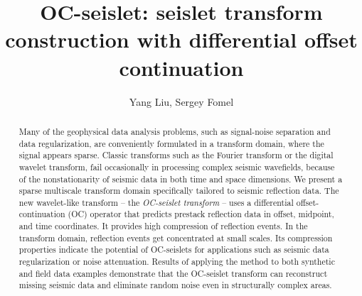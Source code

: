 \title{OC-seislet: seislet transform construction with differential offset continuation}

\renewcommand{\thefootnote}{\fnsymbol{footnote}}


\address{
\footnotemark[1] College of Geo-exploration Science and Technology,\\
Jilin University \\
No.6 Xi minzhu street, \\
Changchun, China, 130026 \\
\footnotemark[2] Bureau of Economic Geology,\\
John A. and Katherine G. Jackson School of Geosciences \\
The University of Texas at Austin \\
University Station, Box X \\
Austin, TX, USA, 78713-8924}

\author{Yang Liu\footnotemark[1]\footnotemark[2], Sergey Fomel\footnotemark[2]}

\maketitle

\begin{abstract}

 Many of the geophysical data analysis problems, such as signal-noise
 separation and data regularization, are conveniently formulated in a
 transform domain, where the signal appears sparse. Classic transforms
 such as the Fourier transform or the digital wavelet transform, fail
 occasionally in processing complex seismic wavefields, because of the
 nonstationarity of seismic data in both time and space dimensions. We
 present a sparse multiscale transform domain specifically tailored to
 seismic reflection data. The new wavelet-like transform -- the
 \emph{OC-seislet transform} -- uses a differential
 offset-continuation (OC) operator that predicts prestack reflection
 data in offset, midpoint, and time coordinates. It provides high
 compression of reflection events. In the transform domain, reflection
 events get concentrated at small scales. Its compression properties
 indicate the potential of OC-seislets for applications such as
 seismic data regularization or noise attenuation. Results of applying
 the method to both synthetic and field data examples demonstrate that
 the OC-seislet transform can reconstruct missing seismic data and
 eliminate random noise even in structurally complex areas.
\end{abstract}


